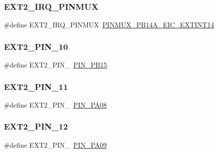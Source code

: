 \mbox{\label{group__samd21__xplained__pro__features__group_ga30035ae80991aa23f39da81428529ac4}} 
\subsubsection{\texorpdfstring{EXT2\_IRQ\_PINMUX}{EXT2\_IRQ\_PINMUX}}
{\footnotesize\ttfamily \#define E\+X\+T2\+\_\+\+I\+R\+Q\+\_\+\+P\+I\+N\+M\+UX~\mbox{\hyperlink{pio_2samd21j18a_8h_ac3753b411b7b24386dfc7b997a6c743f}{P\+I\+N\+M\+U\+X\+\_\+\+P\+B14\+A\+\_\+\+E\+I\+C\+\_\+\+E\+X\+T\+I\+N\+T14}}}

\mbox{\label{group__samd21__xplained__pro__features__group_gafdaa744e4c7e5c93e846a4f0ea9d0fbb}} 
\subsubsection{\texorpdfstring{EXT2\_PIN\_10}{EXT2\_PIN\_10}}
{\footnotesize\ttfamily \#define E\+X\+T2\+\_\+\+P\+I\+N\+\_~\mbox{\hyperlink{pio_2samd21j18a_8h_a2dfe52fc70c0fa20c50efcb5260b7f6e}{P\+I\+N\+\_\+\+P\+B15}}}

\mbox{\label{group__samd21__xplained__pro__features__group_ga7508977dcf3c430814604914ceb0e6f7}} 
\subsubsection{\texorpdfstring{EXT2\_PIN\_11}{EXT2\_PIN\_11}}
{\footnotesize\ttfamily \#define E\+X\+T2\+\_\+\+P\+I\+N\+\_~\mbox{\hyperlink{pio_2samd21j18a_8h_a7dc08bf81d9967156de18aae2cb5fe46}{P\+I\+N\+\_\+\+P\+A08}}}

\mbox{\label{group__samd21__xplained__pro__features__group_gaa500ee1f5679975d1ed2a04657483df5}} 
\subsubsection{\texorpdfstring{EXT2\_PIN\_12}{EXT2\_PIN\_12}}
{\footnotesize\ttfamily \#define E\+X\+T2\+\_\+\+P\+I\+N\+\_~\mbox{\hyperlink{pio_2samd21j18a_8h_ac14663d14647a4a629d8dc37616bf7e4}{P\+I\+N\+\_\+\+P\+A09}}}

